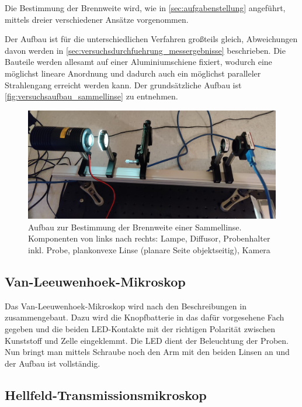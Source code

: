\documentclass[english, ngerman]{scrartcl}
\begin{document}
Die Bestimmung der Brennweite wird, wie in \autoref{sec:aufgabenstellung} angeführt, mittels dreier verschiedener Ansätze vorgenommen.

Der Aufbau ist für die unterschiedlichen Verfahren großteils gleich, Abweichungen davon werden in \autoref{sec:versuchsdurchfuehrung_messergebnisse} beschrieben. Die Bauteile werden allesamt auf einer Aluminiumschiene fixiert, wodurch eine möglichst lineare Anordnung und dadurch auch ein möglichst paralleler Strahlengang erreicht werden kann.
Der grundsätzliche Aufbau ist \autoref{fig:versuchsaufbau_sammellinse} zu entnehmen.
%
\begin{figure}
    \centering
    \begin{samepage}
        \includegraphics[width=0.85\linewidth]{fig/versuch1.jpeg}
        \caption[Aufbau Brennweite Sammellinse]{Aufbau zur Bestimmung der Brennweite einer Sammellinse. Komponenten von links nach rechts: Lampe, Diffusor, Probenhalter inkl. Probe, plankonvexe Linse (planare Seite objektseitig), Kamera}
        \label{fig:versuchsaufbau_sammellinse}
    \end{samepage}
\end{figure}


\subsection{Van-Leeuwenhoek-Mikroskop}
\label{subsec:versuchsanordnung_vanleeuwenhoek}

Das Van-Leeuwenhoek-Mikroskop wird nach den Beschreibungen in \cite{ref:angabe} zusammengebaut. Dazu wird die Knopfbatterie in das dafür vorgesehene Fach gegeben und die beiden LED-Kontakte mit der richtigen Polarität zwischen Kunststoff und Zelle eingeklemmt. Die LED dient der Beleuchtung der Proben. Nun bringt man mittels Schraube noch den Arm mit den beiden Linsen an und der Aufbau ist vollständig.


\subsection{Hellfeld-Transmissionsmikroskop}
\label{subsec:versuchsanordnung_hellfeld}
\end{document}
